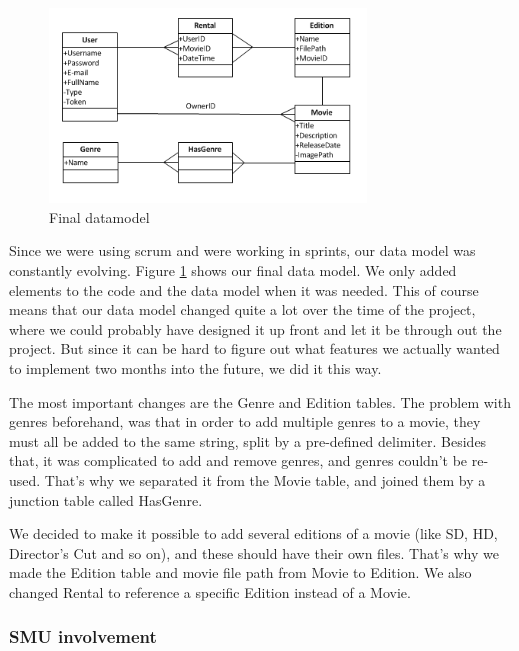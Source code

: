 \begin{figure}[h!]  
  \centering
    \includegraphics[width=0.75\textwidth]{Parts/Images/Design/Database/Datamodel_final}
  \caption{Final datamodel}
  \label{fig:Design_Database_Analysis_ERmodel_Final}
\end{figure}

Since we were using scrum and were working in sprints, our data model was constantly evolving. Figure \ref{fig:Design_Database_Analysis_ERmodel_Final} shows our final data model. We only added elements to the code and the data model when it was needed. This of course means that our data model changed quite a lot over the time of the project, where we could probably have designed it up front and let it be through out the project. But since it can be hard to figure out what features we actually wanted to implement two months into the future, we did it this way.

The most important changes are the Genre and Edition tables. The problem with genres beforehand, was that in order to add multiple genres to a movie, they must all be added to the same string, split by a pre-defined delimiter. Besides that, it was complicated to add and remove genres, and genres couldn't be re-used. That's why we separated it from the Movie table, and joined them by a junction table called HasGenre.

We decided to make it possible to add several editions of a movie (like SD, HD, Director's Cut and so on), and these should have their own files. That's why we made the Edition table and movie file path from Movie to Edition. We also changed Rental to reference a specific Edition instead of a Movie.

\subsubsection{SMU involvement}
\label{Design_Database_Analysis_SMU}


